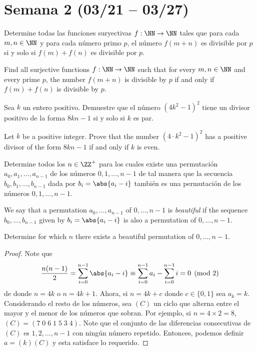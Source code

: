\section{Semana 2 (03/21 -- 03/27)}


\begin{problem}[ISL 2007/N5]
	Determine todas las funciones suryectivas $f:\NN\to\NN$ tales que para cada $m,n\in\NN$ y para cada número primo $p$, el número $f(m+n)$ es divisible por $p$ si y solo si $f(m)+f(n)$ es divisible por $p$.
	\begin{hint}
		Find all surjective functions $f:\NN\to\NN$ such that for every $m,n\in\NN$ and every prime $p$, the number $f(m+n)$ is divisible by $p$ if and only if $f(m)+f(n)$ is divisible by $p$.
	\end{hint}
\end{problem}

\begin{problem}[ISL 2007/N6]
	Sea $k$ un entero positivo. Demuestre que el número $(4k^2-1)^2$ tiene un divisor positivo de la forma $8kn-1$ si y solo si $k$ es par.
	\begin{hint}
		Let $k$ be a positive integer. Prove that the number $(4\cdot k^2-1)^2$ has a positive divisor of the form $8kn-1$ if and only if $k$ is even.
	\end{hint}
\end{problem}

\begin{probER}
	Determine todos los $n\in\ZZ^+$ para los cuales existe una permutación $a_0,a_1,\dots,a_{n-1}$ de los números $0,1,\dots,n-1$ de tal manera que la secuencia $b_0,b_1,\dots,b_{n-1}$ dada por $b_i=\abs{a_i-i}$ también es una permutación de los números $0,1,\dots,n-1$.
	\begin{hint}
		We say that a permutation $a_0,\dots,a_{n-1}$ of $0,\dots,n-1$ is \emph{beautiful} if the sequence $b_0,\dots,b_{n-1}$ given by $b_i=\abs{a_i-i}$ is also a permutation of $0,\dots,n-1$.

		Determine for which $n$ there exists a beautiful permutation of $0,\dots,n-1$.
	\end{hint}
\end{probER}

\begin{proof}
	Note que
	\[\frac{n(n-1)}{2}=\sum_{i=0}^{n-1}\abs{a_i-i}\equiv\sum_{i=0}^{n-1}a_i-\sum_{i=0}^{n-1}i=0\pmod 2\]
	de donde $n=4k$ o $n=4k+1$. Ahora, si $n=4k+c$ donde $c\in\{0,1\}$ sea $a_k=k$. Considerando el resto de los números, sea $(C)$ un ciclo que alterna entre el mayor y el menor de los números que sobran. Por ejemplo, si $n=4\times 2=8$, $(C)=(7\;0\;6\;1\;5\;3\;4)$. Note que el conjunto de las diferencias consecutivas de $(C)$ es $1,2,\dots,n-1$ con ningún número repetido. Entonces, podemos definir $a=(k)(C)$ y esta satisface lo requerido.
\end{proof}


